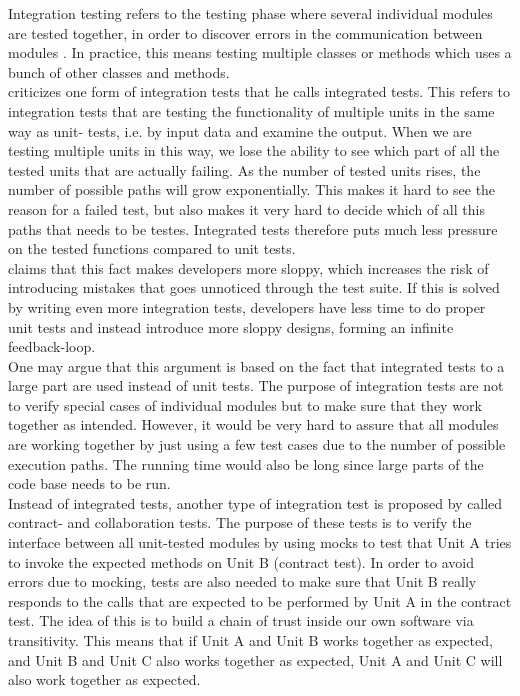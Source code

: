 Integration testing refers to the testing phase where several individual
modules are tested together, in order to discover errors in the
communication between modules \cite{wiki:integrationtests}. In practice,
this means testing multiple classes or methods which uses a bunch of
other classes and methods.\\

\citet{video:integrated_scam} criticizes one form of integration tests
that he calls integrated tests. This refers to integration tests that
are testing the functionality of multiple units in the same way as unit-
tests, i.e. by input data and examine the output. When we are testing
multiple units in this way, we lose the ability to see which part of all
the tested units that are actually failing. As the number of tested
units rises, the number of possible paths will grow exponentially. This
makes it hard to see the reason for a failed test, but also makes it
very hard to decide which of all this paths that needs to be testes.
Integrated tests therefore puts much less pressure on the tested
functions compared to unit tests.\\

\citeauthor{video:integrated_scam} claims that this fact makes
developers more sloppy, which increases the risk of introducing mistakes
that goes unnoticed through the test suite. If this is solved by writing
even more integration tests, developers have less time to do proper unit
tests and instead introduce more sloppy designs, forming an infinite
feedback-loop.\\

One may argue that this argument is based on the fact that integrated
tests to a large part are used instead of unit tests. The purpose of
integration tests are not to verify special cases of individual modules
but to make sure that they work together as intended. However, it would
be very hard to assure that all modules are working together by just
using a few test cases due to the number of possible execution paths.
The running time would also be long since large parts of the code base
needs to be run.\\

Instead of integrated tests, another type of integration test is
proposed by \citeauthor{video:integrated_scam} called contract- and
collaboration tests. The purpose of these tests is to verify the
interface between all unit-tested modules by using mocks to test that
Unit A tries to invoke the expected methods on Unit B (contract test).
In order to avoid errors due to mocking, tests are also needed to make
sure that Unit B really responds to the calls that are expected to be
performed by Unit A in the contract test. The idea of this is to build a
chain of trust inside our own software via transitivity. This means that
if Unit A and Unit B works together as expected, and Unit B and Unit C
also works together as expected, Unit A and Unit C will also work
together as expected.\\
